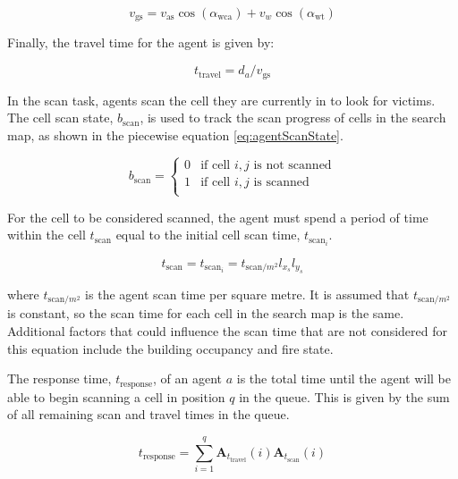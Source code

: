 \documentclass[conference]{IEEEtran}
\begin{document}
\begin{equation}
    v_{\text{gs}} = v_{\text{as}} \cos(\alpha_{\text{wca}}) + v_{w} \cos (\alpha_{\text{wt}})
\end{equation}

Finally, the travel time for the agent is given by:

\begin{equation}
    t_{\text{travel}} = d_{a} / v_{\text{gs}}
\end{equation}

In the scan task, agents scan the cell they are currently in to look for victims.
The cell scan state, $b_{\text{scan}}$, is used to track the scan progress of cells in the search map, as shown in the piecewise equation \ref{eq:agentScanState}.

\begin{equation} \label{eq:agentScanState}
    b_{\text{scan}} = 
    \begin{cases} 
        0 & \text{if cell $i,j$ is not scanned}\\
        1 & \text{if cell $i,j$ is scanned}\\
    \end{cases}
\end{equation}

For the cell to be considered scanned, the agent must spend a period of time within the cell $t_{\text{scan}}$ equal to the initial cell scan time, $t_{\text{scan}_{i}}$.

\begin{equation}
    t_{\text{scan}} = t_{\text{scan}_{i}} = t_{\text{scan}/m^{2}} l_{x_{s}} l_{y_{s}}
\end{equation}

where $t_{\text{scan}/m^{2}}$ is the agent scan time per square metre.
It is assumed that $t_{\text{scan}/m^{2}}$ is constant, so the scan time for each cell in the search map is the same.
Additional factors that could influence the scan time that are not considered for this equation include the building occupancy and fire state.

The response time, $t_{\text{response}}$, of an agent $a$ is the total time until the agent will be able to begin scanning a cell in position $q$ in the queue.
This is given by the sum of all remaining scan and travel times in the queue.

\begin{equation} \label{eq:t_response}
    t_{\text{response}} = \sum_{i=1}^{q} \bm{A}_{t_{\text{travel}}}(i) \bm{A}_{t_{\text{scan}}}(i)
\end{equation}
\end{document}
